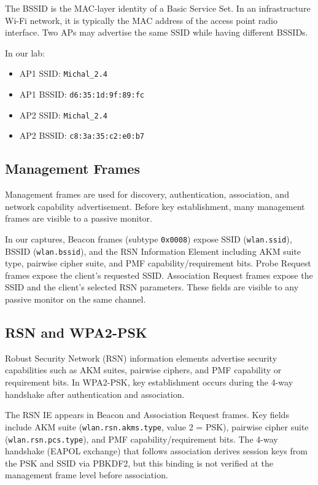 \documentclass[12pt,a4paper]{article}
\begin{document}
The BSSID is the MAC-layer identity of a Basic Service Set. In an infrastructure Wi-Fi network, it is typically the MAC address of the access point radio interface. Two APs may advertise the same SSID while having different BSSIDs.

In our lab:
\begin{itemize}
    \item AP1 SSID: \texttt{Michal\_2.4}
    \item AP1 BSSID: \texttt{d6:35:1d:9f:89:fc}
    \item AP2 SSID: \texttt{Michal\_2.4}
    \item AP2 BSSID: \texttt{c8:3a:35:c2:e0:b7}
\end{itemize}

\subsection{Management Frames}

Management frames are used for discovery, authentication, association, and network capability advertisement. Before key establishment, many management frames are visible to a passive monitor.

In our captures, Beacon frames (subtype \texttt{0x0008}) expose SSID (\texttt{wlan.ssid}), BSSID (\texttt{wlan.bssid}), and the RSN Information Element including AKM suite type, pairwise cipher suite, and PMF capability/requirement bits. Probe Request frames expose the client's requested SSID. Association Request frames expose the SSID and the client's selected RSN parameters. These fields are visible to any passive monitor on the same channel.

\subsection{RSN and WPA2-PSK}

Robust Security Network (RSN) information elements advertise security capabilities such as AKM suites, pairwise ciphers, and PMF capability or requirement bits. In WPA2-PSK, key establishment occurs during the 4-way handshake after authentication and association.

The RSN IE appears in Beacon and Association Request frames. Key fields include AKM suite (\texttt{wlan.rsn.akms.type}, value 2 = PSK), pairwise cipher suite (\texttt{wlan.rsn.pcs.type}), and PMF capability/requirement bits. The 4-way handshake (EAPOL exchange) that follows association derives session keys from the PSK and SSID via PBKDF2, but this binding is not verified at the management frame level before association.
\end{document}
